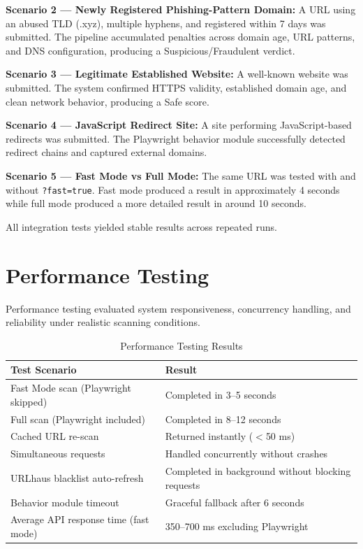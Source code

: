 \textbf{Scenario 2 — Newly Registered Phishing-Pattern Domain:}  
A URL using an abused TLD (.xyz), multiple hyphens, and registered within 7 days was submitted. The pipeline accumulated penalties across domain age, URL patterns, and DNS configuration, producing a Suspicious/Fraudulent verdict.

\textbf{Scenario 3 — Legitimate Established Website:}  
A well-known website was submitted. The system confirmed HTTPS validity, established domain age, and clean network behavior, producing a Safe score.

\textbf{Scenario 4 — JavaScript Redirect Site:}  
A site performing JavaScript-based redirects was submitted. The Playwright behavior module successfully detected redirect chains and captured external domains.

\textbf{Scenario 5 — Fast Mode vs Full Mode:}  
The same URL was tested with and without \texttt{?fast=true}. Fast mode produced a result in approximately 4 seconds while full mode produced a more detailed result in around 10 seconds.

All integration tests yielded stable results across repeated runs.

\section{Performance Testing}

Performance testing evaluated system responsiveness, concurrency handling, and reliability under realistic scanning conditions.

\begin{table}[h]
\centering
\begin{tabular}{|ll|}
\toprule
Test Scenario & Result \\
\midrule
Fast Mode scan (Playwright skipped) & Completed in 3--5 seconds \\
Full scan (Playwright included) & Completed in 8--12 seconds \\
Cached URL re-scan & Returned instantly ($<$50 ms) \\
Simultaneous requests & Handled concurrently without crashes \\
URLhaus blacklist auto-refresh & Completed in background without blocking requests \\
Behavior module timeout & Graceful fallback after 6 seconds \\
Average API response time (fast mode) & 350--700 ms excluding Playwright \\
\bottomrule
\end{tabular}
\caption{Performance Testing Results}
\end{table}

